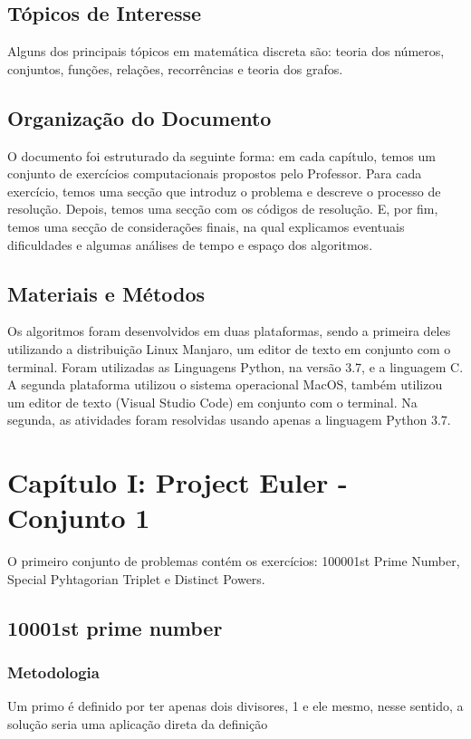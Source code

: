 \documentclass{article}
\begin{document}
    \subsection{Tópicos de Interesse}
    Alguns dos principais tópicos em matemática discreta são: teoria dos números, conjuntos, funções, relações, recorrências e teoria dos grafos.
    
    \subsection{Organização do Documento}
    O documento foi estruturado da seguinte forma: em cada capítulo, temos um conjunto de exercícios computacionais propostos pelo Professor. Para cada exercício, temos uma secção que introduz o problema e descreve o processo de resolução.
    Depois, temos uma secção com os códigos de resolução. E, por fim, temos uma secção de considerações finais, na qual explicamos eventuais dificuldades e algumas análises de tempo e espaço dos algoritmos.
    
    \subsection{Materiais e Métodos}
    Os algoritmos foram desenvolvidos em duas plataformas, sendo a primeira deles utilizando a distribuição Linux Manjaro, um editor de texto em conjunto com o terminal. Foram utilizadas as Linguagens Python, na versão 3.7, e a linguagem C. A segunda plataforma utilizou o sistema operacional MacOS, também utilizou um editor de texto (Visual Studio Code) em conjunto com o terminal. Na segunda, as atividades foram resolvidas usando apenas a linguagem Python 3.7.

\section{Capítulo I: Project Euler - Conjunto 1}
O primeiro conjunto de problemas contém os exercícios: 100001st Prime Number, Special Pyhtagorian Triplet e Distinct Powers.
    \subsection{10001st prime number }
       
        \subsubsection{Metodologia} 
        Um primo é definido por ter apenas dois divisores, 1 e ele mesmo, nesse sentido, a solução seria uma aplicação direta da definição
       
\end{document}
